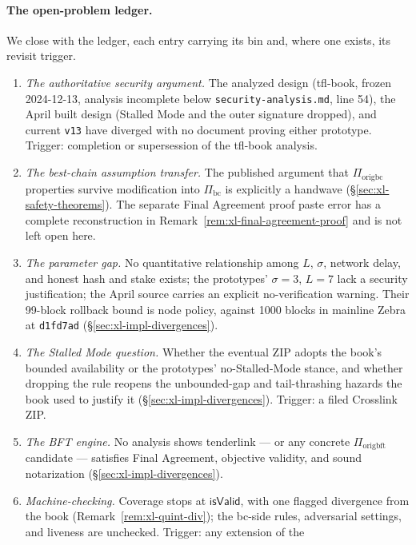 \documentclass[11pt,a4paper]{article}
\theoremstyle{definition}
\begin{document}
\paragraph{The open-problem ledger.} We close with the ledger, each entry
carrying its bin and, where one exists, its revisit trigger.

\begin{enumerate}
\item \emph{The authoritative security argument.} The analyzed design
  (tfl-book, frozen 2024-12-13, analysis incomplete below
  \texttt{security-analysis.md}, line 54), the April built design
  (Stalled Mode and the outer signature dropped), and current
  \texttt{v13} have diverged with no document proving either prototype.
  Trigger: completion or supersession of the tfl-book analysis.
\item \emph{The best-chain assumption transfer.} The published argument
  that $\Pi_{\mathrm{origbc}}$ properties survive modification into
  $\Pi_{\mathrm{bc}}$ is explicitly a handwave
  (\S\ref{sec:xl-safety-theorems}). The separate Final Agreement proof
  paste error has a complete reconstruction in
  Remark~\ref{rem:xl-final-agreement-proof} and is not left open here.
\item \emph{The parameter gap.} No quantitative relationship among $L$,
  $\sigma$, network delay, and honest hash and stake exists; the
  prototypes' $\sigma = 3$, $L = 7$ lack a security justification; the
  April source carries an explicit no-verification warning. Their
  99-block rollback bound is node policy, against 1000 blocks in mainline
  Zebra at \texttt{d1fd7ad} (\S\ref{sec:xl-impl-divergences}).
\item \emph{The Stalled Mode question.} Whether the eventual ZIP adopts
  the book's bounded availability or the prototypes' no-Stalled-Mode
  stance, and whether dropping the rule reopens the
  unbounded-gap and tail-thrashing hazards the book used to justify it
  (\S\ref{sec:xl-impl-divergences}). Trigger: a filed Crosslink ZIP.
\item \emph{The BFT engine.} No analysis shows tenderlink --- or any
  concrete $\Pi_{\mathrm{origbft}}$ candidate --- satisfies Final
  Agreement, objective validity, and sound notarization
  (\S\ref{sec:xl-impl-divergences}).
\item \emph{Machine-checking.} Coverage stops at
  $\mathsf{isValid}$, with one flagged divergence from the book
  (Remark~\ref{rem:xl-quint-div}); the bc-side rules, adversarial
  settings, and liveness are unchecked. Trigger: any extension of the

\end{enumerate}
\end{document}
